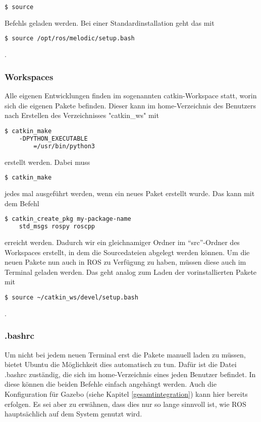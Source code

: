 \begin{lstlisting}[language=bash]
$ source
\end{lstlisting}

Befehls geladen werden. Bei einer Standardinstallation geht das mit 

\begin{lstlisting}[language=bash]
$ source /opt/ros/melodic/setup.bash
\end{lstlisting}. \cite{martinez2013learning}

\subsubsection{Workspaces}
Alle eigenen Entwicklungen finden im sogenannten catkin-Workspace statt, worin sich die eigenen Pakete befinden. Dieser kann im home-Verzeichnis des Benutzers nach Erstellen des Verzeichnisses "catkin\_ws" mit 

\begin{lstlisting}[language=bash]
$ catkin_make 
	-DPYTHON_EXECUTABLE
		=/usr/bin/python3
\end{lstlisting}

erstellt werden. Dabei muss 

\begin{lstlisting}[language=bash]
$ catkin_make
\end{lstlisting}

jedes mal ausgeführt werden, wenn ein neues Paket erstellt wurde. Das kann mit dem Befehl 

\begin{lstlisting}[language=bash]
$ catkin_create_pkg my-package-name 
	std_msgs rospy roscpp
\end{lstlisting}

erreicht werden. Dadurch wir ein gleichnamiger Ordner im ``src''-Ordner des Workspaces erstellt, in dem die Sourcedateien abgelegt werden können. Um die neuen Pakete nun auch in ROS zu Verfügung zu haben, müssen diese auch im Terminal geladen werden. Das geht analog zum Laden der vorinstallierten Pakete mit 

\begin{lstlisting}[language=bash]
$ source ~/catkin_ws/devel/setup.bash
\end{lstlisting}.
 
\subsubsection{.bashrc}
Um nicht bei jedem neuen Terminal erst die Pakete manuell laden zu müssen, bietet Ubuntu die Möglichkeit dies automatisch zu tun. Dafür ist die Datei .bashrc zuständig, die sich im home-Verzeichnis eines jeden Benutzer befindet. In diese können die beiden Befehle einfach angehängt werden. Auch die Konfiguration für Gazebo (siehe Kapitel \ref{gesamtintegration}) kann hier bereits erfolgen. Es sei aber zu erwähnen, dass dies nur so lange sinnvoll ist, wie ROS hauptsächlich auf dem System genutzt wird. 
